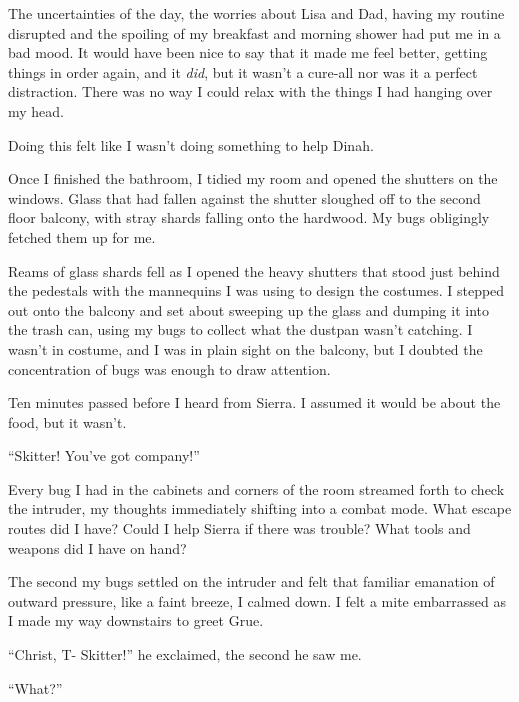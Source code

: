 The uncertainties of the day, the worries about Lisa and Dad, having my routine disrupted and the spoiling of my breakfast and morning shower had put me in a bad mood.  It would have been nice to say that it made me feel better, getting things in order again, and it \emph{did}, but it wasn't a cure-all nor was it a perfect distraction.  There was no way I could relax with the things I had hanging over my head.



Doing this felt like I wasn't doing something to help Dinah.



Once I finished the bathroom, I tidied my room and opened the shutters on the windows.  Glass that had fallen against the shutter sloughed off to the second floor balcony, with stray shards falling onto the hardwood.  My bugs obligingly fetched them up for me.



Reams of glass shards fell as I opened the heavy shutters that stood just behind the pedestals with the mannequins I was using to design the costumes.  I stepped out onto the balcony and set about sweeping up the glass and dumping it into the trash can, using my bugs to collect what the dustpan wasn't catching.  I wasn't in costume, and I was in plain sight on the balcony, but I doubted the concentration of bugs was enough to draw attention.



Ten minutes passed before I heard from Sierra.  I assumed it would be about the food, but it wasn't.



``Skitter!  You've got company!''



Every bug I had in the cabinets and corners of the room streamed forth to check the intruder, my thoughts immediately shifting into a combat mode.  What escape routes did I have?  Could I help Sierra if there was trouble?  What tools and weapons did I have on hand?



The second my bugs settled on the intruder and felt that familiar emanation of outward pressure, like a faint breeze, I calmed down.  I felt a mite embarrassed as I made my way downstairs to greet Grue.



``Christ, T- Skitter!'' he exclaimed, the second he saw me.



``What?''



